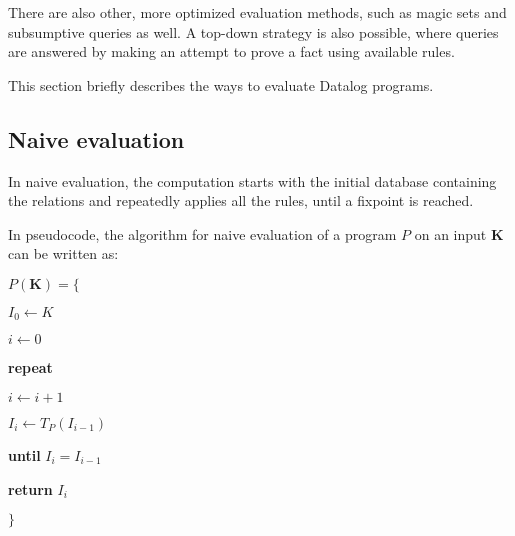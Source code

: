 There are also other, more optimized evaluation methods, such as magic sets \cite{magicsets} and subsumptive queries \cite{subsumptivequeries} as well. A top-down strategy \cite{fod, subsumptivequeries} is also possible, where queries are answered by making an attempt to prove a fact using available rules.

This section briefly describes the ways to evaluate Datalog programs.

\subsection{Naive evaluation}\label{ss:datalognaiveeval}
In naive evaluation, the computation starts with the initial database containing the \edb relations and repeatedly applies all the rules, until a fixpoint is reached.

In pseudocode, the algorithm for naive evaluation of a program $P$ on an input $\textbf{K}$ can be written as:

\vspace{0.5cm}
\parbox{0.5\textwidth}{
$P(\textbf{K}) = \{$

{\addtolength{\leftskip}{5mm}

$I_0 \leftarrow K$

$i \leftarrow 0$

\textbf{repeat}

{\addtolength{\leftskip}{5mm}

$i \leftarrow i + 1$

$I_i \leftarrow T_P(I_{i-1})$

}

\textbf{until} $I_i = I_{i-1}$

\textbf{return} $I_i$

}

$\}$
}

